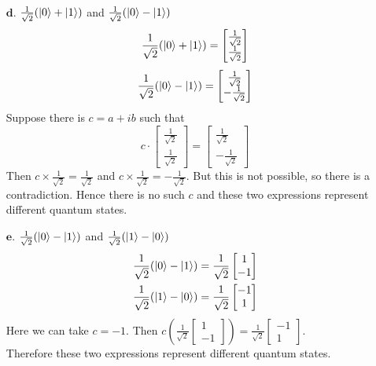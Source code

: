 \documentclass[11pt]{article}
\begin{document}
\begin{enumerate}
\item[$\textbf{d.}$] 
	$\frac{1}{\sqrt{2}}(\ket{0} + \ket{1})$ and $\frac{1}{\sqrt{2}}(\ket{0} - \ket{1})$\\
	$$\frac{1}{\sqrt{2}}(\ket{0} + \ket{1}) = \begin{bmatrix}
			\frac{1}{\sqrt{2}} \\ 
			\frac{1}{\sqrt{2}}\end{bmatrix}$$
	$$\frac{1}{\sqrt{2}}(\ket{0} - \ket{1}) = \begin{bmatrix}
		\frac{1}{\sqrt{2}} \\ 
		-\frac{1}{\sqrt{2}}\end{bmatrix}$$  
	Suppose there is $c = a + ib$ such that 
	$$c \cdot \begin{bmatrix}
			\frac{1}{\sqrt{2}} \\ 
			\frac{1}{\sqrt{2}}\end{bmatrix} 
		= \begin{bmatrix}
		\frac{1}{\sqrt{2}} \\ 
		-\frac{1}{\sqrt{2}}\end{bmatrix}$$
	Then $c \times \frac{1}{\sqrt{2}} = \frac{1}{\sqrt{2}}$
	and  $c \times \frac{1}{\sqrt{2}} = -\frac{1}{\sqrt{2}}$.
	But this is not possible, so there is a contradiction.
	Hence there is no such $c$ and these two expressions represent different 
		quantum states.
 



\item[$\textbf{e.}$] 
	$\frac{1}{\sqrt{2}}(\ket{0} - \ket{1})$ and $\frac{1}{\sqrt{2}}(\ket{1} - \ket{0})$
	\begin{align*}
		\frac{1}{\sqrt{2}}(\ket{0} - \ket{1}) &= 
		\frac{1}{\sqrt{2}}\begin{bmatrix}1 \\ -1\end{bmatrix}\\
		\frac{1}{\sqrt{2}}(\ket{1} - \ket{0}) &= 
		\frac{1}{\sqrt{2}}\begin{bmatrix}-1 \\ 1\end{bmatrix}
	\end{align*}
	Here we can take $c = -1$. 
	Then $c(\frac{1}{\sqrt{2}}\begin{bmatrix}1 \\ -1\end{bmatrix}) =  \frac{1}{\sqrt{2}}\begin{bmatrix}-1 \\ 1\end{bmatrix}$. \\
	Therefore these two expressions represent different quantum states.


\end{enumerate}
\end{document}
